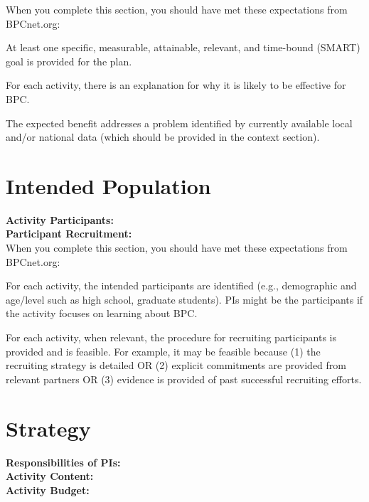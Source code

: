 \documentclass{proposalnsf}
\begin{document}
\color{Turquoise}
When you complete this section, you should have met these expectations from BPCnet.org: 
\begin{rubricitem}
    \item At least one specific, measurable, attainable, relevant, and time-bound (SMART) goal is provided for the plan. 
    \item For each activity, there is an explanation for why it is likely to be effective for BPC. 
    \item The expected benefit addresses a problem identified by currently available local and/or national data (which should be provided in the context section).
\end{rubricitem}

\color{Black}
\section{Intended Population}
\textbf{Activity Participants:} \\
\textbf{Participant Recruitment:} \\

\color{Turquoise}
When you complete this section, you should have met these expectations from BPCnet.org: 
\begin{rubricitem}
    \item For each activity, the intended participants are identified (e.g., demographic and age/level such as high school, graduate students). PIs might be the participants if the activity focuses on learning about BPC.
    \item For each activity, when relevant, the procedure for recruiting participants is provided and is feasible. For example, it may be feasible because (1) the recruiting strategy is detailed OR (2) explicit commitments are provided from relevant partners OR (3) evidence is provided of past successful recruiting efforts.
\end{rubricitem}

\color{Black}
\section{Strategy}
\textbf{Responsibilities of PIs:} \\
\textbf{Activity Content:} \\
\textbf{Activity Budget:} \\
\end{document}

